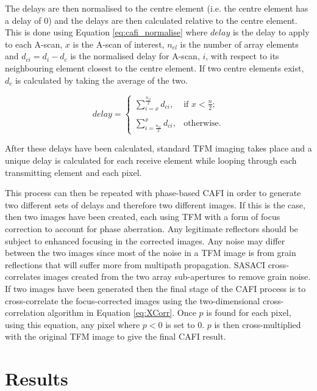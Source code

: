 The delays are then normalised to the centre element (i.e. the centre element has a delay of 0) and the delays are then calculated relative to the centre element. This is done using Equation \ref{eq:cafi_normalise} where $delay$ is the delay to apply to each A-scan, $x$ is the A-scan of interest, $n_{el}$ is the number of array elements and $d_{ci} = d_i - d_c$ is the normalised delay for A-scan, $i$, with respect to its neighbouring element closest to the centre element. If two centre elements exist, $d_c$ is calculated by taking the average of the two.



\begin{equation} \label{eq:cafi_normalise}
delay = \begin{cases}
		\sum\limits_{i = x}^{\frac{n_{el}}{2}} d_{ci}, & \text{if }x<\frac{n}{2}\text{;}\\
		\\
		\sum\limits_{i = \frac{n_{el}}{2}}^{x} d_{ci}, & \text{otherwise.}
\end{cases}
\end{equation}

After these delays have been calculated, standard TFM imaging takes place and a unique delay is calculated for each receive element while looping through each transmitting element and each pixel.

This process can then be repeated with phase-based CAFI in order to generate two different sets of delays and therefore two different images. If this is the case, then two images have been created, each using TFM with a form of focus correction to account for phase aberration. Any legitimate reflectors should be subject to enhanced focusing in the corrected images. Any noise may differ between the two images since most of the noise in a TFM image is from grain reflections that will suffer more from multipath propagation. SASACI cross-correlates images created from the two array sub-apertures to remove grain noise. If two images have been generated then the final stage of the CAFI process is to cross-correlate the focus-corrected images using the two-dimensional cross-correlation algorithm in Equation \ref{eq:XCorr}. Once $p$ is found for each pixel, using this equation, any pixel where $p < 0$ is set to 0. $p$ is then cross-multiplied with the original TFM image to give the final CAFI result.

\section{Results}

